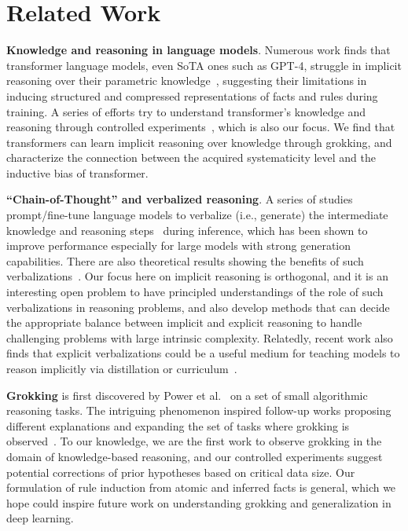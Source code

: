 \section{Related Work}
\label{sec:related_work}

\noindent\textbf{Knowledge and reasoning in language models}. Numerous work finds that transformer language models, even SoTA ones such as GPT-4, struggle in implicit reasoning over their parametric knowledge~\citep{talmor2020olmpics, kassner2020pretrained, rogers-etal-2020-primer, rae2021scaling, press-etal-2023-measuring, allenzhu2023physics, yang2024large}, suggesting their limitations in inducing structured and compressed representations of facts and rules during training. A series of efforts try to understand transformer's knowledge and reasoning through controlled experiments~\citep{kassner-etal-2020-pretrained, prystawski2023why, dziri2023faith, wang2024understanding}, which is also our focus. We find that transformers can learn implicit reasoning over knowledge through grokking, and characterize the connection between the acquired systematicity level and the inductive bias of transformer.

\noindent\textbf{``Chain-of-Thought'' and verbalized reasoning}. A series of studies prompt/fine-tune language models to verbalize (i.e., generate) the intermediate knowledge and reasoning steps~\citep{wei2022chain,wang-etal-2022-iteratively,zelikman2022star,sun2023recitationaugmented,liu-etal-2023-crystal, zelikman2024quietstar} during inference, which has been shown to improve performance especially for large models with strong generation capabilities. There are also theoretical results showing the benefits of such verbalizations~\citep{feng2023towards, li2024chain}. Our focus here on implicit reasoning is orthogonal, and it is an interesting open problem to have principled understandings of the role of such verbalizations in reasoning problems, and also develop methods that can decide the appropriate balance between implicit and explicit reasoning to handle challenging problems with large intrinsic complexity. Relatedly, recent work also finds that explicit verbalizations could be a useful medium for teaching models to reason implicitly via distillation or curriculum~\citep{deng2023implicit, deng2024explicit}. 

\noindent\textbf{Grokking} is first discovered by Power et al.~\citep{power2022grokking} on a set of small algorithmic reasoning tasks. The intriguing phenomenon inspired follow-up works proposing different explanations and expanding the set of tasks where grokking is observed~\citep{thilak2022slingshot, liu2022towards, davies2022unifying, notsawo2023predicting, nanda2023progress, varma2023explaining, merrill2023a, murty-etal-2023-grokking, liu2023omnigrok, zhu2024critical, huang2024unified}. To our knowledge, we are the first work to observe grokking in the domain of knowledge-based reasoning, and our controlled experiments suggest potential corrections of prior hypotheses based on critical data size. Our formulation of rule induction from atomic and inferred facts is general, which we hope could inspire future work on understanding grokking and generalization in deep learning.

